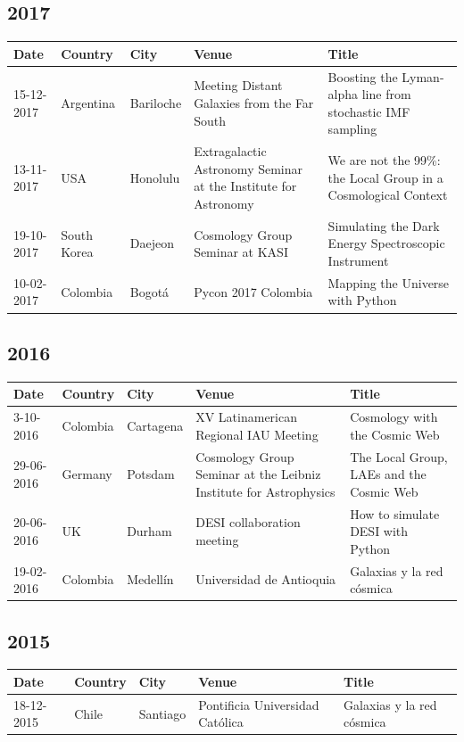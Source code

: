 \documentclass{article}
\begin{document}
\subsection*{2017}
\noindent
\begin{tabular}{p{2.0cm} p{1.5cm} p{1.5cm} p{5.0cm} p{5.0cm}}\hline
Date & Country & City& Venue & Title\\\hline
15-12-2017 & Argentina & Bariloche & Meeting Distant Galaxies from the
Far South & Boosting the Lyman-alpha line from stochastic IMF sampling\\
13-11-2017 & USA & Honolulu & Extragalactic Astronomy Seminar at the Institute for Astronomy & We are not the 99\%: the Local Group in a Cosmological Context\\
19-10-2017 & South Korea & Daejeon & Cosmology Group Seminar at KASI & Simulating the Dark Energy Spectroscopic Instrument\\
10-02-2017 & Colombia & Bogot\'a & Pycon 2017 Colombia & Mapping the Universe with Python\\
\end{tabular}

\subsection*{2016}
\noindent
\begin{tabular}{p{2.0cm} p{1.5cm} p{1.5cm} p{5.0cm} p{5.0cm}}\hline
Date & Country & City& Venue & Title\\\hline
3-10-2016 & Colombia & Cartagena & XV Latinamerican Regional IAU Meeting & Cosmology with the Cosmic Web\\
29-06-2016 & Germany & Potsdam & Cosmology Group Seminar at the Leibniz Institute for Astrophysics & The Local Group, LAEs and the Cosmic Web\\
20-06-2016 & UK & Durham & DESI collaboration meeting & How to simulate DESI with Python\\
19-02-2016 & Colombia & Medell\'in & Universidad de Antioquia & Galaxias y la red c\'osmica\\
\end{tabular}

\subsection*{2015}
\noindent
\begin{tabular}{p{2.0cm} p{1.5cm} p{1.5cm} p{5.0cm} p{5.0cm}}\hline
Date & Country & City& Venue & Title\\\hline
18-12-2015 & Chile & Santiago & Pontificia Universidad Cat\'olica& Galaxias y la red c\'osmica \\
\end{tabular}
\end{document}

